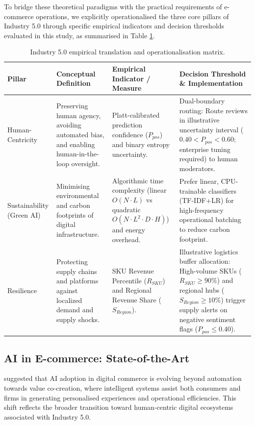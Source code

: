 \documentclass[authoryear,review,3p,times,12pt]{elsarticle}
\begin{document}
To bridge these theoretical paradigms with the practical requirements of e-commerce operations, we explicitly operationalised the three core pillars of Industry 5.0 through specific empirical indicators and decision thresholds evaluated in this study, as summarised in Table \ref{tab:industry5_operationalisation}.

\begin{table}
\centering
\small
\renewcommand{\arraystretch}{1.2}
\caption{Industry 5.0 empirical translation and operationalisation matrix.}
\label{tab:industry5_operationalisation}
\begin{tabular}{p{2.5cm}p{4cm}p{4cm}p{4.5cm}}
\hline
\textbf{Pillar} & \textbf{Conceptual Definition} & \textbf{Empirical Indicator / Measure} & \textbf{Decision Threshold \& Implementation} \\ \hline
Human-Centricity & Preserving human agency, avoiding automated bias, and enabling human-in-the-loop oversight. & Platt-calibrated prediction confidence ($P_{pos}$) and binary entropy uncertainty. & Dual-boundary routing: Route reviews in illustrative uncertainty interval ($0.40 < P_{pos} < 0.60$; enterprise tuning required) to human moderators. \\
Sustainability (Green AI) & Minimising environmental and carbon footprints of digital infrastructure. & Algorithmic time complexity (linear $O(N \cdot L)$ vs quadratic $O(N \cdot L^2 \cdot D \cdot H)$) and energy overhead. & Prefer linear, CPU-trainable classifiers (TF-IDF+LR) for high-frequency operational batching to reduce carbon footprint. \\
Resilience & Protecting supply chains and platforms against localized demand and supply shocks. & SKU Revenue Percentile ($R_{SKU}$) and Regional Revenue Share ($S_{Region}$). & Illustrative logistics buffer allocation: High-volume SKUs ($R_{SKU} \ge 90\%$) and regional hubs ($S_{Region} \ge 10\%$) trigger supply alerts on negative sentiment flags ($P_{pos} \le 0.40$). \\ \hline
\end{tabular}
\end{table}

\subsection{AI in E-commerce: State-of-the-Art}
\cite{BANSAL2026100023} suggested that AI adoption in digital commerce is evolving beyond automation towards value co-creation, where intelligent systems assist both consumers and firms in generating personalised experiences and operational efficiencies. This shift reflects the broader transition toward human-centric digital ecosystems associated with Industry 5.0.
\end{document}
